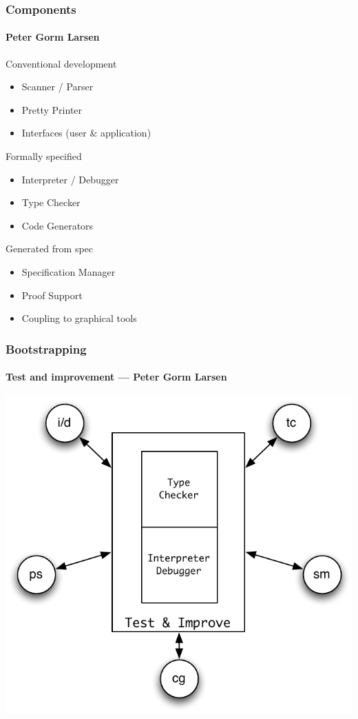 \documentclass[slidestop,uncompress,mathserif]{beamer}
\begin{document}
\begin{frame}
  \frametitle{Components}
  \framesubtitle{Peter Gorm Larsen \cite{Larsen01}}

  \begin{block}{Conventional development}
	{\scriptsize \begin{itemize}
		\item Scanner / Parser
		\item Pretty Printer
		\item Interfaces (user \& application)
	  \end{itemize}}
  \end{block}

  \begin{block}{Formally specified}
	{\scriptsize \begin{itemize}
	  \item Interpreter / Debugger
	  \item Type Checker
	  \item Code Generators
	\end{itemize}}
  \end{block}
  
  \begin{block}{Generated from spec}
	{\scriptsize \begin{itemize}
		\item Specification Manager
		\item Proof Support
		\item Coupling to graphical tools
	  \end{itemize}}
  \end{block}
\end{frame}

\begin{frame}[c]
  \frametitle{Bootstrapping}
  \framesubtitle{Test and improvement --- Peter Gorm Larsen \cite{Larsen01}}
 
  \begin{center}
    \includegraphics[width=.6\textwidth]{images/test_improve.pdf}
  \end{center}
\end{frame}
\end{document}
